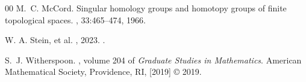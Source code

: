 \documentclass[preprint,review,12pt]{elsarticle}
\begin{document}
\begin{thebibliography}{00}
M.~C. McCord.
\newblock Singular homology groups and homotopy groups of finite topological
  spaces.
, 33:465--474, 1966.

{W. A. Stein, et al.}
, 2023.
.

S.~J. Witherspoon.
, volume 204 of {\em Graduate
  Studies in Mathematics}.
\newblock American Mathematical Society, Providence, RI, [2019] \copyright
  2019.

\end{thebibliography}
\end{document}
